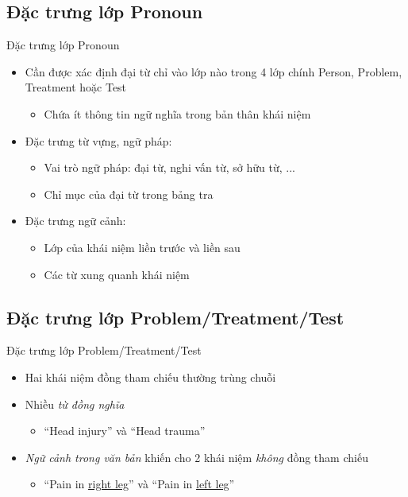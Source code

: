 \subsection*{Đặc trưng lớp Pronoun}
\begin{frame}{Đặc trưng lớp Pronoun}
\putlogo
\begin{itemize}
	\item Cần được xác định đại từ chỉ vào lớp nào trong 4 lớp chính Person, Problem, Treatment hoặc Test
	\begin{itemize}
		\item Chứa ít thông tin ngữ nghĩa trong bản thân khái niệm		
	\end{itemize}
	\item Đặc trưng từ vựng, ngữ pháp:
	\begin{itemize}
		\item Vai trò ngữ pháp: đại từ, nghi vấn từ, sở hữu từ, ...
		\item Chỉ mục của đại từ trong bảng tra
	\end{itemize}
	\item Đặc trưng ngữ cảnh:
	\begin{itemize}
		\item Lớp của khái niệm liền trước và liền sau
		\item Các từ xung quanh khái niệm
	\end{itemize}
\end{itemize}
\end{frame}

\subsection*{Đặc trưng lớp Problem/Treatment/Test}
\begin{frame}{Đặc trưng lớp Problem/Treatment/Test}
\putlogo
\begin{itemize}
	\item Hai khái niệm đồng tham chiếu thường {\color{red} trùng chuỗi}
	\item Nhiều \emph{từ đồng nghĩa}
	\begin{itemize}
		\item ``Head injury'' và ``Head trauma''
	\end{itemize}
	\item \emph{Ngữ cảnh trong văn bản} khiến cho 2 khái niệm \emph{không} đồng tham chiếu
	\begin{itemize}
		\item ``Pain in \underline{right leg}'' và ``Pain in \underline{left leg}''
	\end{itemize}
\end{itemize}
\end{frame}


